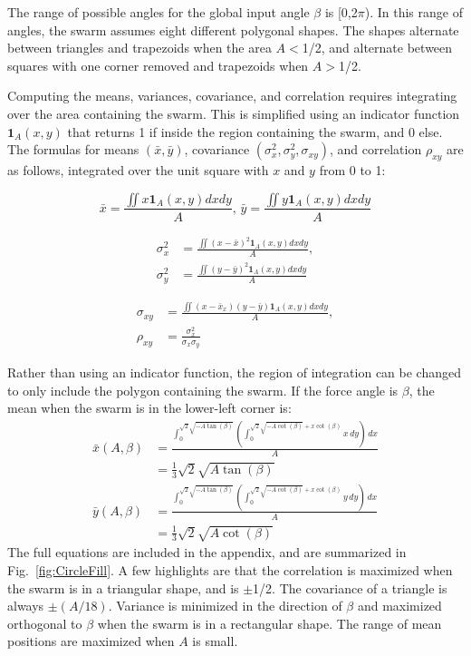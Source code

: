The range of possible angles for the global input angle $\beta $ is [0,2$\pi $). In this range of angles, the swarm assumes eight different polygonal shapes. The shapes alternate between triangles and trapezoids when the area $A$$<$1/2, and alternate between squares with one corner removed and trapezoids when $A$$>$1/2.

Computing the means, variances, covariance, and correlation requires integrating over the area containing the swarm.  This is simplified using an indicator function $\bm{1}_A(x,y)$ that returns 1 if inside the region containing the swarm, and 0 else. The formulas for means $(\bar{x},\bar{y})$, covariance $(\sigma^2_x,\sigma^2_y,\sigma_{xy})$, and correlation $\rho_{xy}$ are as follows, integrated over the unit square with $x$ and $y$ from 0 to 1:

\begin{equation}\label{eq:meanInSquareWorkspace}
\bar{x} =\frac{\iint x \bm{1}_A(x,y)dxdy}{A}
\text{, }
\bar{y}=\frac{\iint y \bm{1}_A(x,y)dxdy}{A}
\end{equation}

\begin{align}\label{eq:varInSquareWorkspace}
\sigma^2_x &=\frac{\iint \left(x-\bar{x}\right)^2 \bm{1}_A(x,y) dx dy}{A}, \\
\sigma^2_y &=\frac{\iint  \left(y-\bar{y}\right)^2 \bm{1}_A(x,y) dx dy}{A}
\end{align}

\begin{align}\label{eq:covAndcorrInSquareWorkspace}
\sigma_{xy} &= \frac{\iint  \left(x-\bar{x}_x\right) \left(y-\bar{y}\right) \bm{1}_A(x,y) dx dy}{A},\\
\rho_{xy} &= \frac{\sigma^2_x}{\sigma_x\sigma_y}
\end{align}

Rather than using an indicator function, the region of integration can be changed to only include the polygon containing the swarm. If the force angle is $\beta$, the mean when the swarm is in the lower-left corner is:
\begin{align}\label{eq:meanInSquareWorkspaceLL}
\bar{x}(A,\beta) &= \frac{\int_0^{\sqrt{2} \sqrt{-A \tan (\beta )}} \left(\int_0^{\sqrt{2} \sqrt{-A \cot (\beta )}+x \cot (\beta )} x \, dy\right) \, dx}{A} \nonumber \\
	&=\frac{1}{3} \sqrt{2} \sqrt{A \tan (\beta )}\\
\bar{y}(A,\beta) &= \frac{\int_0^{\sqrt{2} \sqrt{-A \tan (\beta )}} \left(\int_0^{\sqrt{2} \sqrt{-A \cot (\beta )}+x \cot (\beta )} y \, dy\right) \, dx}{A} \nonumber\\
	&=\frac{1}{3} \sqrt{2} \sqrt{A \cot (\beta )}
\end{align}
The full equations are included in the appendix, and are summarized in Fig.~\ref{fig:CircleFill}. A few highlights are that the correlation is maximized when the swarm is in a triangular shape, and is $\pm$1/2. The covariance of a triangle is always $\pm(A/18)$. Variance is minimized in the direction of $\beta$ and maximized orthogonal to $\beta$ when the swarm is in a rectangular shape. The range of mean positions are maximized when $A$ is small.

